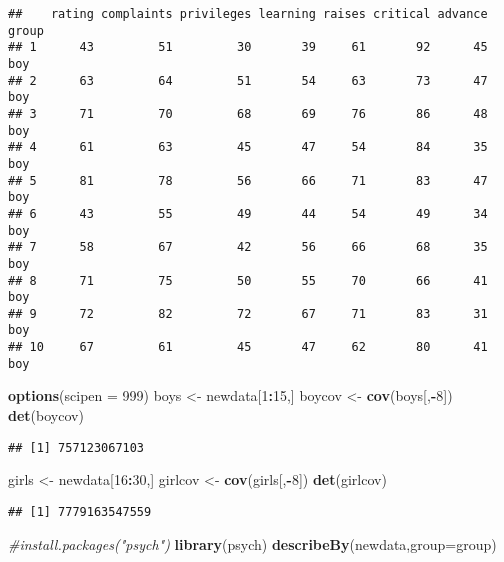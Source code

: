 \documentclass[]{article}
\newenvironment{Shaded}{\begin{snugshade}}{\end{snugshade}}
\newcommand{\KeywordTok}[1]{\textcolor[rgb]{0.13,0.29,0.53}{\textbf{#1}}}
\newcommand{\DataTypeTok}[1]{\textcolor[rgb]{0.13,0.29,0.53}{#1}}
\newcommand{\DecValTok}[1]{\textcolor[rgb]{0.00,0.00,0.81}{#1}}
\newcommand{\StringTok}[1]{\textcolor[rgb]{0.31,0.60,0.02}{#1}}
\newcommand{\CommentTok}[1]{\textcolor[rgb]{0.56,0.35,0.01}{\textit{#1}}}
\newcommand{\OperatorTok}[1]{\textcolor[rgb]{0.81,0.36,0.00}{\textbf{#1}}}
\newcommand{\NormalTok}[1]{#1}
\begin{document}
\begin{verbatim}
##    rating complaints privileges learning raises critical advance group
## 1      43         51         30       39     61       92      45   boy
## 2      63         64         51       54     63       73      47   boy
## 3      71         70         68       69     76       86      48   boy
## 4      61         63         45       47     54       84      35   boy
## 5      81         78         56       66     71       83      47   boy
## 6      43         55         49       44     54       49      34   boy
## 7      58         67         42       56     66       68      35   boy
## 8      71         75         50       55     70       66      41   boy
## 9      72         82         72       67     71       83      31   boy
## 10     67         61         45       47     62       80      41   boy
\end{verbatim}

\begin{Shaded}
\begin{Highlighting}[]
\KeywordTok{options}\NormalTok{(}\DataTypeTok{scipen =} \DecValTok{999}\NormalTok{)}
\NormalTok{boys <-}\StringTok{ }\NormalTok{newdata[}\DecValTok{1}\OperatorTok{:}\DecValTok{15}\NormalTok{,]}
\NormalTok{boycov <-}\StringTok{ }\KeywordTok{cov}\NormalTok{(boys[,}\OperatorTok{-}\DecValTok{8}\NormalTok{])}
\KeywordTok{det}\NormalTok{(boycov)}
\end{Highlighting}
\end{Shaded}

\begin{verbatim}
## [1] 757123067103
\end{verbatim}

\begin{Shaded}
\begin{Highlighting}[]
\NormalTok{girls <-}\StringTok{ }\NormalTok{newdata[}\DecValTok{16}\OperatorTok{:}\DecValTok{30}\NormalTok{,]}
\NormalTok{girlcov <-}\StringTok{ }\KeywordTok{cov}\NormalTok{(girls[,}\OperatorTok{-}\DecValTok{8}\NormalTok{])}
\KeywordTok{det}\NormalTok{(girlcov)}
\end{Highlighting}
\end{Shaded}

\begin{verbatim}
## [1] 7779163547559
\end{verbatim}

\begin{Shaded}
\begin{Highlighting}[]
\CommentTok{#install.packages("psych")}
\KeywordTok{library}\NormalTok{(psych)}
\KeywordTok{describeBy}\NormalTok{(newdata,}\DataTypeTok{group=}\NormalTok{group)}
\end{Highlighting}
\end{Shaded}
\end{document}
